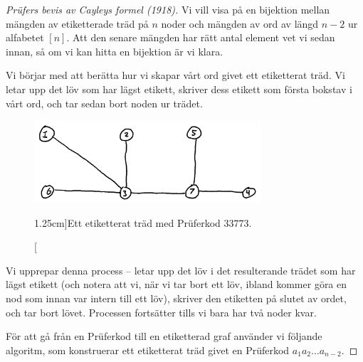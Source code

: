 \documentclass[nobib]{tufte-handout}
\begin{document}
\begin{proof}[Prüfers bevis av Cayleys formel (1918)]
    Vi vill visa på en bijektion mellan mängden av etiketterade träd på $n$ noder och mängden av ord av längd $n-2$ ur alfabetet $[n]$. Att den senare mängden har rätt antal element vet vi sedan innan, så om vi kan hitta en bijektion är vi klara.

    Vi börjar med att berätta hur vi skapar vårt ord givet ett etiketterat träd. Vi letar upp det löv som har lägst etikett, skriver dess etikett som första bokstav i vårt ord, och tar sedan bort noden ur trädet.

    \begin{figure}
        \centering
        \includegraphics[width=0.75\textwidth]{graphics/prufer_code_tree_example.png}
        \caption[][1.25cm]{Ett etiketterat träd med Prüferkod $33773$.}
    \end{figure}

    Vi upprepar denna process -- letar upp det löv i det resulterande trädet som har lägst etikett (och notera att vi, när vi tar bort ett löv, ibland kommer göra en nod som innan var intern till ett löv), skriver den etiketten på slutet av ordet, och tar bort lövet. Processen fortsätter tills vi bara har två noder kvar.

    För att gå från en Prüferkod till en etiketterad graf använder vi följande algoritm, som konstruerar ett etiketterat träd givet en Prüferkod $a_1a_2\ldots a_{n-2}$.


\end{proof}
\end{document}
